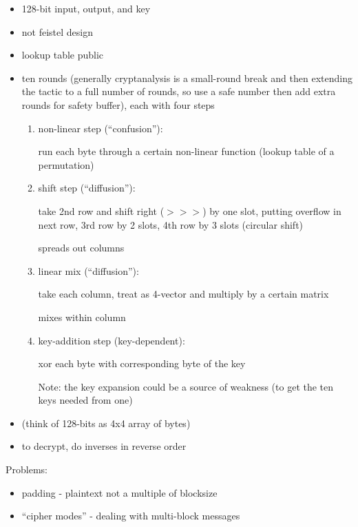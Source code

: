\begin{itemize}
    \item 128-bit input, output, and key
    \item not feistel design
    \item lookup table public

    \item ten rounds (generally cryptanalysis is a small-round break and then
            extending the tactic to a full number of rounds, so use a safe
            number then add extra rounds for safety buffer), each with four steps
        \begin{enumerate}
            \item non-linear step (``confusion''):

                run each byte through a certain non-linear function (lookup
                table of a permutation)
            \item shift step (``diffusion''):

                take 2nd row and shift right ($>>>$) by one slot, putting
                overflow in next row, 3rd row by 2 slots, 4th row by 3 slots
                (circular shift)

                spreads out columns
            \item linear mix (``diffusion''):

                take each column, treat as 4-vector and multiply by a certain
                matrix

                mixes within column
            \item key-addition step (key-dependent):

                xor each byte with corresponding byte of the key

                Note: the key expansion could be a source of weakness (to get
                the ten keys needed from one)
        \end{enumerate}
    \item (think of 128-bits as 4x4 array of bytes)
    \item to decrypt, do inverses in reverse order
\end{itemize}

Problems:
\begin{itemize}
    \item padding - plaintext not a multiple of blocksize
    \item ``cipher modes'' - dealing with multi-block messages
\end{itemize}

